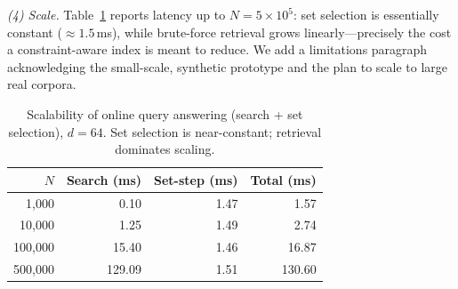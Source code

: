 \emph{(4) Scale.} Table~\ref{tab:scale} reports latency up to $N=5\times10^{5}$: set selection is essentially constant ($\approx1.5$\,ms), while brute-force retrieval grows linearly---precisely the cost a constraint-aware index is meant to reduce. We add a limitations paragraph acknowledging the small-scale, synthetic prototype and the plan to scale to large real corpora.

\begin{table}[h]
\centering\small
\caption{Scalability of online query answering (search + set selection), $d{=}64$. Set selection is near-constant; retrieval dominates scaling.}
\label{tab:scale}
\begin{tabular}{rrrr}
\toprule
$N$ & Search (ms) & Set-step (ms) & Total (ms) \\
\midrule
1{,}000    & 0.10  & 1.47 & 1.57 \\
10{,}000   & 1.25  & 1.49 & 2.74 \\
100{,}000  & 15.40 & 1.46 & 16.87 \\
500{,}000  & 129.09 & 1.51 & 130.60 \\
\bottomrule
\end{tabular}
\end{table}
